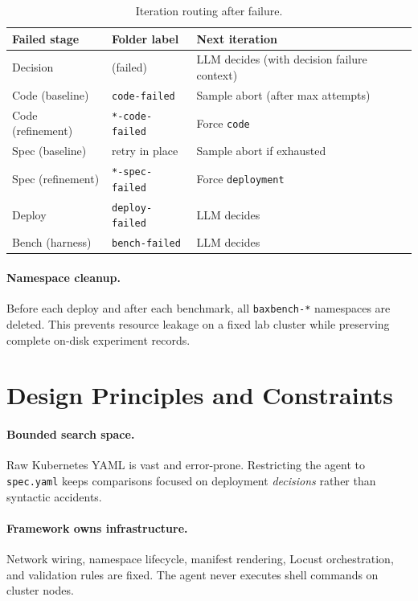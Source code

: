 \begin{table}[t]
  \centering
  \caption{Iteration routing after failure.}
  \label{tab:failure-routing}
  \small
  \begin{tabular}{@{}lll@{}}
    \toprule
    \textbf{Failed stage} & \textbf{Folder label} & \textbf{Next iteration} \\
    \midrule
    Decision & (failed) & LLM decides (with decision failure context) \\
    Code (baseline) & \texttt{code-failed} & Sample abort (after max attempts) \\
    Code (refinement) & \texttt{*-code-failed} & Force \texttt{code} \\
    Spec (baseline) & retry in place & Sample abort if exhausted \\
    Spec (refinement) & \texttt{*-spec-failed} & Force \texttt{deployment} \\
    Deploy & \texttt{deploy-failed} & LLM decides \\
    Bench (harness) & \texttt{bench-failed} & LLM decides \\
    \bottomrule
  \end{tabular}
\end{table}

\paragraph{Namespace cleanup.}
Before each deploy and after each benchmark, all \texttt{baxbench-*} namespaces
are deleted.  This prevents resource leakage on a fixed lab cluster while
preserving complete on-disk experiment records.


\section{Design Principles and Constraints}
\label{sec:methods-design}

\paragraph{Bounded search space.}
Raw Kubernetes YAML is vast and error-prone.  Restricting the agent to
\texttt{spec.yaml} keeps comparisons focused on deployment \emph{decisions}
rather than syntactic accidents.

\paragraph{Framework owns infrastructure.}
Network wiring, namespace lifecycle, manifest rendering, Locust orchestration,
and validation rules are fixed.  The agent never executes shell commands on
cluster nodes.

